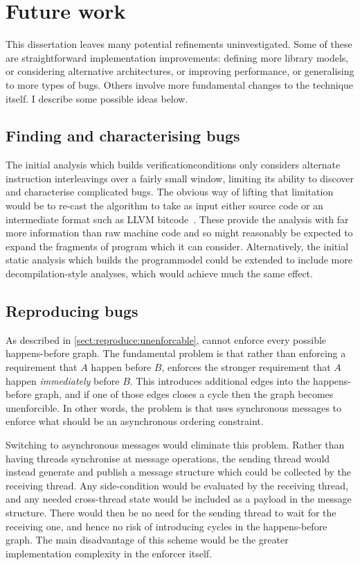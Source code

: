 \chapter{Future work}
\label{sect:fw}

This dissertation leaves many potential refinements uninvestigated.
Some of these are straightforward implementation improvements:
defining more {\StateMachine} library models, or considering
alternative architectures, or improving performance, or generalising
to more types of bugs.  Others involve more fundamental changes to the
{\technique} technique itself.  I describe some possible ideas below.

\section{Finding and characterising bugs}

The initial analysis which builds \glspl{verificationcondition} only
considers alternate instruction interleavings over a fairly small
window, limiting its ability to discover and characterise complicated
bugs.  The obvious way of lifting that limitation would be to re-cast
the algorithm to take as input either source code or an intermediate
format such as LLVM bitcode~\cite{FFFLattner2013}.  These provide the
analysis with far more information than raw machine code and so might
reasonably be expected to expand the fragments of program which it can
consider.  Alternatively, the initial static analysis which builds the
\gls{programmodel} could be extended to include more
decompilation-style analyses, which would achieve much the same
effect.

\section{Reproducing bugs}

As described in \autoref{sect:reproduce:unenforcable}, {\technique}
cannot enforce every possible happens-before graph.  The fundamental
problem is that rather than enforcing a requirement that $A$ happen
before $B$, {\technique} enforces the stronger requirement that $A$
happen \emph{immediately} before $B$.  This introduces additional edges
into the happens-before graph, and if one of those edges closes a
cycle then the graph becomes unenforcible.  In other words, the
problem is that {\technique} uses synchronous messages to enforce what
should be an asynchronous ordering constraint.

Switching to asynchronous messages would eliminate this problem.
Rather than having threads synchronise at message operations, the
sending thread would instead generate and publish a message structure
which could be collected by the receiving thread.  Any side-condition
would be evaluated by the receiving thread, and any needed
cross-thread state would be included as a payload in the message
structure.  There would then be no need for the sending thread to wait
for the receiving one, and hence no risk of introducing cycles in the
happens-before graph.  The main disadvantage of this scheme would be
the greater implementation complexity in the enforcer itself.

